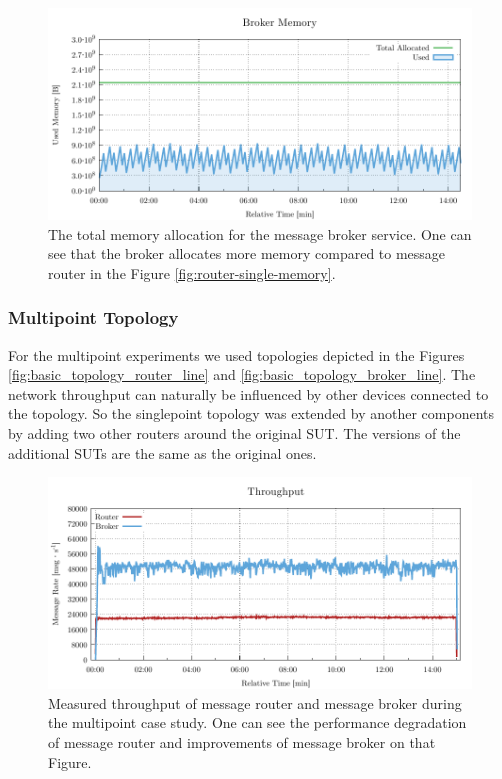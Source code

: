 \begin{figure}[H]
	\centering
	\includegraphics[width=1\linewidth]{obrazky-figures/charts/singlepoint-broker-throughput-memory.pdf}
	\caption{The total memory allocation for the message broker service. One can see that the broker allocates more memory compared to message router in the Figure \ref{fig:router-single-memory}.}
	\label{fig:broker-single-memory}
\end{figure}


\subsubsection*{Multipoint Topology}
For the multipoint experiments we used topologies depicted in the Figures \ref{fig:basic_topology_router_line} and \ref{fig:basic_topology_broker_line}. The network throughput can naturally be influenced by other devices connected to the topology. So the singlepoint topology was extended by another components by adding two other routers around the original SUT. The versions of the additional SUTs are the same as the original ones.

\begin{figure}[H]
	\centering
	\includegraphics[width=1\linewidth]{obrazky-figures/charts/multipoint-throughput.pdf}
	\caption{Measured throughput of message router and message broker during the multipoint case study. One can see the performance degradation of message router and improvements of message broker on that Figure.}
	\label{fig:rate-multipoint-router}
\end{figure}

